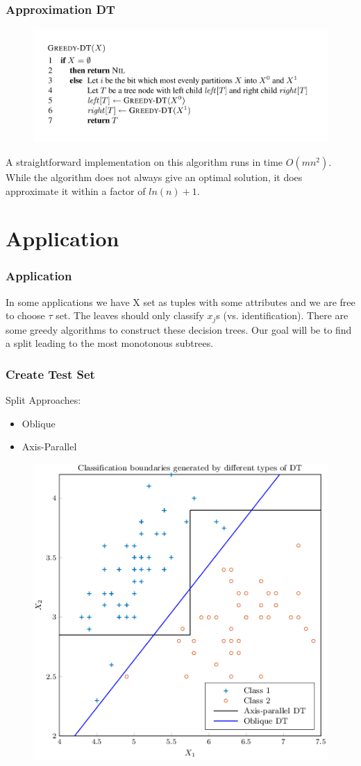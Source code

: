 \documentclass{beamer}
\begin{document}
\begin{frame}
	\frametitle{Approximation DT}
	\begin{figure}
		\includegraphics[width=0.9\linewidth]{Pics/greedy.png}
	\end{figure}
	
	A straightforward implementation on this algorithm runs in time $O(mn^2)$. While the algorithm does not
	always give an optimal solution, it does approximate it within a factor of $ln(n) + 1$.
\end{frame}

\section{Application}
\begin{frame}
	\frametitle{Application}
	\begin{block}{}
		In some applications we have X set as tuples with some attributes and we are free to choose $\tau$ set.
		The leaves should only classify $x_j$s (vs. identification).
		There are some greedy algorithms to construct these decision trees. Our goal will be to find a 
		split leading to the most monotonous subtrees.
	\end{block}
\end{frame}
\begin{frame}
	\frametitle{Create Test Set}
	Split Approaches:
	\begin{itemize}
		\item
		Oblique
		\item
		Axis-Parallel \checkmark
	\end{itemize}
	\begin{figure}
		\includegraphics[width=0.5\linewidth]{Pics/oblique.png}
	\end{figure}
\end{frame}
\end{document}
